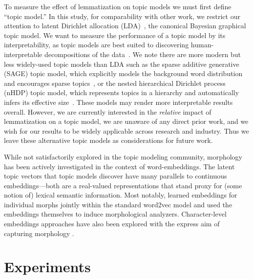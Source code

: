 \documentclass[11pt,letterpaper]{article}
\newcommand{\Note}[3]{\sethlcolor{#2}\hl{[\textbf{#1}: #3]}}
\renewcommand{\Note}[3]{}
\newcommand{\ryan}[1]{\Note{ryan}{lightorange}{#1}}
\newcommand{\todo}[1]{\Note{todo}{red}{#1}}
\begin{document}
{To measure the effect of lemmatization on topic models we must first
define ``topic model.''  In this study, for comparability with other
work, we restrict our attention to latent Dirichlet allocation
(LDA)~\cite{blei2003}, the canonical Bayesian graphical topic model.
We want to measure the performance of a topic model by its
interpretability, as topic models are best suited to discovering
human-interpretable decompositions of the data~\cite{may2015}.
We note there are more modern but less widely-used topic models than
LDA such as the sparse additive generative
(SAGE) topic model, which explicitly models the background word
distribution and encourages sparse topics~\cite{eisenstein2011}, or the
nested hierarchical Dirichlet process (nHDP) topic model, which
represents topics in a hierarchy and automatically infers its effective
size~\cite{paisley2015}.  These models may render more interpretable
results overall.  However, we are currently interested in the
\emph{relative} impact of lemmatization on a topic model, we are
unaware of any direct prior work, and we wish for our results to be
widely applicable across research and industry.  Thus we leave these
alternative topic models as considerations for future work.

While not satisfactorily explored in the topic modeling community,
morphology has been actively investigated in the context of
word-embeddings.  The latent topic vectors that topic models discover
have many parallels to continuous embeddings---both are a real-valued
representations that stand proxy for (some notion of) lexical semantic
information. Most notably,  learned
embeddings for individual morphs jointly within the standard {\sc word2vec}
model \cite{mikolov2013distributed} and  used the embeddings
themselves to induce morphological analyzers. Character-level embeddings approaches
have also been explored with the express aim of capturing morphology \cite{santos2014learning,LingDBTFAML15}.

\ryan{Add self citation to NAACL 2015 in camera ready. Keep out for anonymity.}
\todo{mention word sense disambiguation applications of topic models?
    they rely more heavily on lemmatization but use topic models (to
    some degree) as substitutes for models of word sense...}


\section{Experiments}\label{sec:experiments}

}
\end{document}
